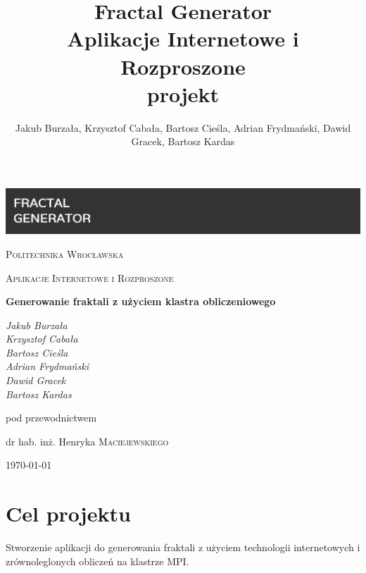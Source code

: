\documentclass[a4paper]{article}
\title{\textbf{Fractal Generator} \\ Aplikacje Internetowe i Rozproszone \\ projekt}
\author{Jakub Burzała, Krzysztof Cabała, Bartosz Cieśla, Adrian Frydmański, Dawid Gracek, Bartosz Kardas}
\begin{document}
\begin{titlepage}
	\centering
	\includegraphics[width=\textwidth]{banner2.png}\par\vspace{1cm}
	{\scshape\LARGE Politechnika Wrocławska \par}
	\vspace{1cm}
	{\scshape\Large Aplikacje Internetowe i Rozproszone\par}
	\vspace{1.5cm}
	{\huge\bfseries Generowanie fraktali z użyciem klastra obliczeniowego \par}
	\vspace{2cm}
	{\Large\itshape Jakub Burzała \\ Krzysztof Cabała \\ Bartosz Cieśla \\ Adrian Frydmański \\ Dawid Gracek \\ Bartosz Kardas \par}
	\vfill
	pod przewodnictwem\par
	dr hab. inż. Henryka \textsc{Maciejewskiego}

	\vfill

	{\large \today\par}
\end{titlepage}

\newpage
\clearpage
\tableofcontents
\newpage

\section{Cel projektu}
Stworzenie aplikacji do generowania fraktali z użyciem technologii internetowych i zrównoleglonych obliczeń na klastrze MPI.
\end{document}
